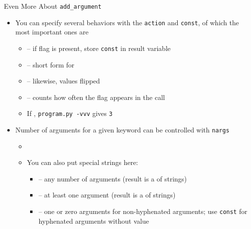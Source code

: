 \begin{frame}[fragile]{Even More About \texttt{add\_argument}}
%
\begin{itemize}
\item You can specify several behaviors with the \texttt{action} and \texttt{const}, of which the most important ones are
	\begin{itemize}
	\item {} -- if flag is present, store \texttt{const} in result variable
	\item {} -- short form for 
	\item {} -- likewise, values flipped
	\item {} -- counts how often the flag appears in the call
	\item If , \texttt{program.py -vvv}  gives \texttt{3}
	\end{itemize}
\item Number of arguments for a given keyword can be controlled with \texttt{nargs}
	\begin{itemize}
	\item {}
	\item You can also put special strings here:
		\begin{itemize}
		\item {} -- any number of arguments (result is a  of strings)
		\item {} -- at least one argument (result is a  of strings)
		\item {} -- one or zero arguments for non-hyphenated arguments; use \texttt{const} for hyphenated arguments without value
		\end{itemize}
	\end{itemize}
\end{itemize}
%
\end{frame}


